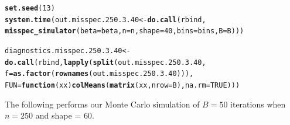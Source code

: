 \documentclass[11pt]{article}\usepackage[]{graphicx}\usepackage[]{color}
\makeatletter
\newcommand{\hlnum}[1]{\textcolor[rgb]{0.686,0.059,0.569}{#1}}%
\newcommand{\hlstd}[1]{\textcolor[rgb]{0.345,0.345,0.345}{#1}}%
\newcommand{\hlkwa}[1]{\textcolor[rgb]{0.161,0.373,0.58}{\textbf{#1}}}%
\newcommand{\hlkwb}[1]{\textcolor[rgb]{0.69,0.353,0.396}{#1}}%
\newcommand{\hlkwc}[1]{\textcolor[rgb]{0.333,0.667,0.333}{#1}}%
\newcommand{\hlkwd}[1]{\textcolor[rgb]{0.737,0.353,0.396}{\textbf{#1}}}%
\newenvironment{kframe}{%
 \def\at@end@of@kframe{}%
 \ifinner\ifhmode%
  \def\at@end@of@kframe{\end{minipage}}%
  \begin{minipage}{\columnwidth}%
 \fi\fi%
 \def\FrameCommand##1{\hskip\@totalleftmargin \hskip-\fboxsep
 \colorbox{shadecolor}{##1}\hskip-\fboxsep
     \hskip-\linewidth \hskip-\@totalleftmargin \hskip\columnwidth}%
 \MakeFramed {\advance\hsize-\width
   \@totalleftmargin\z@ \linewidth\hsize
   \@setminipage}}%
 {\par\unskip\endMakeFramed%
 \at@end@of@kframe}
\newenvironment{knitrout}{}{} %
\makeatother
\begin{document}
\begin{knitrout}
\color{fgcolor}\begin{kframe}
\begin{alltt}
\hlkwd{set.seed}\hlstd{(}\hlnum{13}\hlstd{)}
\hlkwd{system.time}\hlstd{(out.misspec.250.3.40} \hlkwb{<-} \hlkwd{do.call}\hlstd{(rbind,}
  \hlkwd{misspec_simulator}\hlstd{(}\hlkwc{beta} \hlstd{= beta,} \hlkwc{n} \hlstd{= n,} \hlkwc{shape} \hlstd{=} \hlnum{40}\hlstd{,} \hlkwc{bins} \hlstd{= bins,} \hlkwc{B} \hlstd{= B)))}
\end{alltt}


{\ttfamily\noindent\bfseries\color{errorcolor}{\#\# Error in chol.default(crossprod(x) + lambda[j] * diag(v)): the leading minor of order 5 is not positive definite}}

{\ttfamily\noindent\itshape\color{messagecolor}{\#\# Timing stopped at: 0.184 0 0.184}}\begin{alltt}
\hlstd{diagnostics.misspec.250.3.40} \hlkwb{<-} \hlkwd{do.call}\hlstd{(rbind,} \hlkwd{lapply}\hlstd{(}\hlkwd{split}\hlstd{(out.misspec.250.3.40,}
  \hlkwc{f} \hlstd{=} \hlkwd{as.factor}\hlstd{(}\hlkwd{rownames}\hlstd{(out.misspec.250.3.40))),}
  \hlkwc{FUN} \hlstd{=} \hlkwa{function}\hlstd{(}\hlkwc{xx}\hlstd{)} \hlkwd{colMeans}\hlstd{(}\hlkwd{matrix}\hlstd{(xx,} \hlkwc{nrow} \hlstd{= B),} \hlkwc{na.rm} \hlstd{=} \hlnum{TRUE}\hlstd{)))}
\end{alltt}


{\ttfamily\noindent\bfseries\color{errorcolor}{\#\# Error in split(out.misspec.250.3.40, f = as.factor(rownames(out.misspec.250.3.40))): object 'out.misspec.250.3.40' not found}}\end{kframe}
\end{knitrout}


The following performs our Monte Carlo simulation of $B = 50$ iterations 
when $n = 250$ and shape = $60$.
\end{document}
